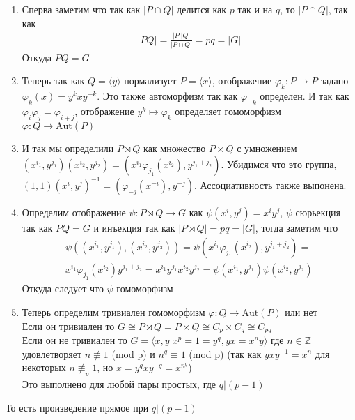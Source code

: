 		\begin{enumerate}
			\item 
			Сперва заметим что так как $|P \cap Q|$ делится как $p$ так и на $q$, то $|P \cap Q|$, так как
			\begin{gather*}
				|PQ| = \frac{|P||Q|}{|P \cap Q|} = pq = |G|
			\end{gather*}
			Откуда $PQ =G$
			\item 
			Теперь так как $Q = \langle y \rangle$ нормализует $P = \langle x \rangle$, отображение $\varphi_k: P \to P$ задано $\varphi_k(x) = y^k x y^{-k}$. Это также автоморфизм так как $\varphi_{-k}$ определен. И так как $\varphi_i \varphi_j = \varphi_{i+j}$, отображение $y^k \mapsto \varphi_k$ определяет гомоморфизм $\varphi: Q \to \text{Aut}(P)$
			\item 
			И так мы определили $P \rtimes Q$ как множество $P \times Q$ с умножением $(x^{i_1},y^{j_1})(x^{i_2},y^{j_2}) = (x^{i_1} \varphi_{j_1}(x^{i_2}), y^{j_1 + j_2})$. Убидимся что это группа, $(1,1)(x^i,y^j)^{-1} = (\varphi_{-j}(x^{-i}),y^{-j})$. Ассоциативность также выпонена.
			\item 
			Определим отображение $\psi: P \rtimes Q \to G$ как $\psi(x^i, y^j) = x^i y^j$, $\psi$ сюрьекция так как $PQ = G$ и инъекция так как $|P \rtimes Q| = pq = |G|$, тогда заметим что 
			\begin{gather*}
				\psi((x^{i_1},y^{j_1}),(x^{i_2},y^{j_2})) = \psi(x^{i_1}\varphi_{j_1}(x^{i_2}),y^{j_1 + j_2}) =\\
				x^{i_1} \varphi_{j_1}(x^{i_2}) y^{j_1 + j_2} = x^{i_1} y^{j_1} x^{i_2} y^{j_2} = \psi(x^{i_1},y^{j_1})\psi(x^{i_2},y^{j_2})
			\end{gather*}
			Откуда следует что $\psi$ гомоморфизм
			\item 
			Теперь определим тривиален гомоморфизм $\varphi: Q \to \text{Aut}(P)$ или нет\\
			Если он тривиален то $G \cong P \rtimes Q = P \times Q \cong C_p \times C_q \cong C_{pq}$\\
			Если он не тривиален то $G = \langle x,y | x^p = 1 = y^q, yx = x^n y \rangle$ где $n \in \mathbb{Z}$ удовлетворяет $n \not \equiv 1$ (mod p) и $n^q \equiv 1$ (mod p) (так как $yxy^{-1} = x^n$ для некоторых $n \not \equiv_p 1$, но $x = y^q x y^{-q} = x^{n^q}$)\\
			Это выполнено для любой пары простых, где $q | (p-1)$			
		\end{enumerate}
		То есть произведение прямое при $q | (p-1)$
	
		\newpage	

